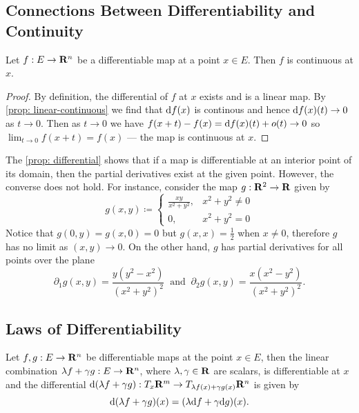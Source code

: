 \subsection{Connections Between Differentiability and Continuity}

\begin{corollary}
  Let \(f: E \to \mathbf{R}^n\) be a differentiable map at a point \(x \in E\).
  Then \(f\) is continuous at \(x\).
\end{corollary}

\begin{proof}
  By definition, the differential of \(f\) at \(x\) exists and is a linear map.
  By \cref{prop: linear-continuous} we find that \(\mathrm{d} f(x)\) is continous and
  hence \(\mathrm{d} f(x)(t) \to 0\) as \(t \to 0\). Then as \(t \to 0\) we have
  \(f(x + t) - f(x) = \mathrm{d} f(x)(t) + o(t) \to 0\) so \(\lim_{t \to 0} f(x + t)
  = f(x)\) --- the map is continuous at \(x\).
\end{proof}

\begin{remark}
  The \cref{prop: differential} shows that if a map is differentiable at an
  interior point of its domain, then the partial derivatives exist at the given
  point. However, the converse does not hold. For instance, consider the map
  \(g: \mathbf{R}^2 \to \mathbf{R}\) given by
  \[
    g(x, y) \coloneq
    \begin{cases}
      \frac{x y}{x^2 + y^2}, &x^2 + y^2 \neq 0 \\
      0, &x^2 + y^2 = 0
    \end{cases}
  \]
  Notice that \(g(0, y) = g(x, 0) = 0\) but \(g(x, x) = \frac 1 2\) when \(x
  \neq 0\), therefore \(g\) has no limit as \((x,y) \to 0\). On the other hand,
  \(g\) has partial derivatives for all points over the plane
  \[
    \partial_1 g(x, y) = \frac{y (y^2 - x^2)}{(x^2 + y^2)^2}
    \ \text{ and }\
    \partial_2 g(x, y) = \frac{x (x^2 - y^2)}{(x^2 + y^2)^2}.
  \]
\end{remark}

\subsection{Laws of Differentiability}

\begin{theorem}\label{thm: diff-linear}
  Let \(f, g: E \to \mathbf{R}^n\) be differentiable maps at the point \(x \in E\), then
  the linear combination \(\lambda f + \gamma g: E \to \mathbf{R}^n\), where \(\lambda,
  \gamma \in \mathbf{R}\) are scalars, is differentiable at \(x\) and the differential
  \(\mathrm{d}(\lambda f + \gamma g): T_x\mathbf{R}^m \to T_{\lambda f(x) + \gamma
  g(x)}\mathbf{R}^n\) is given by
  \[
    \mathrm{d} (\lambda f + \gamma g)(x) = (\lambda \mathrm{d} f + \gamma \mathrm{d} g)(x).
  \]
\end{theorem}

